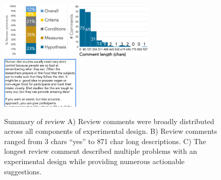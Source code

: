 \begin{figure}[h] 
  \includegraphics[width=0.66\textwidth]{figures/galileo/galileo-study2-2}
  \includegraphics[width=0.33\textwidth]{figures/galileo/galileo-study2-3}
  \caption[Result: Review comments were distributed across all components of experimental design]
{Summary of review A) Review comments were broadly distributed across all components of experimental design. B) Review comments ranged from 3 chars “yes” to 871 char long descriptions. C) The longest review comment described multiple problems with an experimental design while providing numerous actionable suggestions. }
  \label{fig:galileo-result2-2}
\end{figure}

